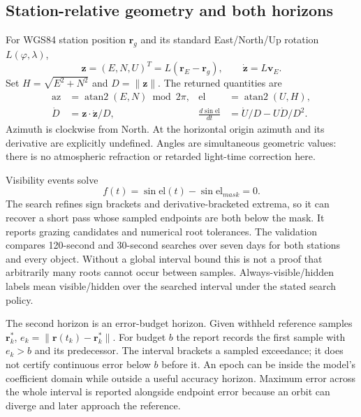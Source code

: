 \subsection{Station-relative geometry and both horizons}
For WGS84 station position $\mathbf r_g$ and its standard East/North/Up rotation
$L(\varphi,\lambda)$,
\begin{equation}
\mathbf z=(E,N,U)^T=L(\mathbf r_E-\mathbf r_g),\qquad
\dot{\mathbf z}=L\mathbf v_E.
\end{equation}
Set $H=\sqrt{E^2+N^2}$ and $D=\|\mathbf z\|$. The returned quantities are
\begin{align}
\mathrm{az}&=\operatorname{atan2}(E,N)\bmod2\pi,&
\mathrm{el}&=\operatorname{atan2}(U,H),\\
\dot D&=\mathbf z\cdot\dot{\mathbf z}/D,&
\frac{d\sin\mathrm{el}}{dt}&=\dot U/D-U\dot D/D^2.
\end{align}
Azimuth is clockwise from North. At the horizontal origin azimuth and its
derivative are explicitly undefined. Angles are simultaneous geometric values:
there is no atmospheric refraction or retarded light-time correction here.

Visibility events solve
\begin{equation}
f(t)=\sin\mathrm{el}(t)-\sin\mathrm{el}_{mask}=0.
\end{equation}
The search refines sign brackets and derivative-bracketed extrema, so it can
recover a short pass whose sampled endpoints are both below the mask. It reports
grazing candidates and numerical root tolerances. The validation compares
120-second and 30-second searches over seven days for both stations and every
object. Without a global interval bound this is not a proof that arbitrarily
many roots cannot occur between samples. Always-visible/hidden labels mean
visible/hidden over the searched interval under the stated search policy.

The second horizon is an error-budget horizon. Given withheld reference samples
$\mathbf r^*_k$, $e_k=\|\mathbf r(t_k)-\mathbf r^*_k\|$. For budget $b$ the report
records the first sample with $e_k>b$ and its predecessor. The interval brackets
a sampled exceedance; it does not certify continuous error below $b$ before it.
An epoch can be inside the model's coefficient domain while outside a useful
accuracy horizon. Maximum error across the whole interval is reported alongside
endpoint error because an orbit can diverge and later approach the reference.

